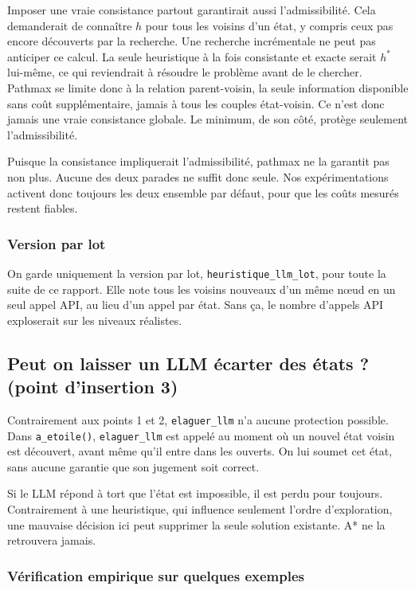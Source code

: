 \documentclass[11pt,a4paper]{article}
\begin{document}
Imposer une vraie consistance partout garantirait aussi l'admissibilité. Cela demanderait de connaître $h$ pour tous les
voisins d'un état, y compris ceux pas encore découverts par la recherche. Une recherche incrémentale ne peut pas anticiper ce calcul. La seule heuristique à la fois consistante et exacte serait $h^*$ lui-même, ce qui reviendrait à résoudre le problème avant de le chercher. Pathmax se limite donc à la relation parent-voisin, la seule information disponible sans coût supplémentaire, jamais à tous les couples état-voisin. Ce n'est donc jamais une vraie consistance globale. Le minimum, de son côté, protège seulement l'admissibilité.

\smallskip
\indent
Puisque la consistance impliquerait l'admissibilité, pathmax ne la garantit pas non plus. Aucune des deux parades ne suffit donc seule. Nos expérimentations activent donc toujours les deux ensemble par défaut, pour que les coûts mesurés restent fiables.

\subsubsection*{Version par lot}

On garde uniquement la version par lot, \texttt{heuristique\_llm\_lot},
pour toute la suite de ce rapport. Elle note tous les voisins nouveaux
d'un même nœud en un seul appel API, au lieu d'un appel par état. Sans
ça, le nombre d'appels API exploserait sur les niveaux réalistes.

\subsection{Peut on laisser un LLM écarter des états ? (point d'insertion 3)}
\label{sec:point3}

Contrairement aux points 1 et 2, \texttt{elaguer\_llm} n'a aucune protection possible. Dans \texttt{a\_etoile()}, \texttt{elaguer\_llm} est appelé au moment où un nouvel état voisin est découvert, avant même qu'il entre dans les ouverts. On lui soumet cet état, sans aucune garantie que son jugement soit correct. 

\medskip
\noindent
Si le LLM répond à tort que l'état est impossible, il est perdu pour toujours. Contrairement à une heuristique, qui influence
seulement l'ordre d'exploration, une mauvaise décision ici peut
supprimer la seule solution existante. A* ne la retrouvera jamais.

\subsubsection*{Vérification empirique sur quelques exemples}
\end{document}
